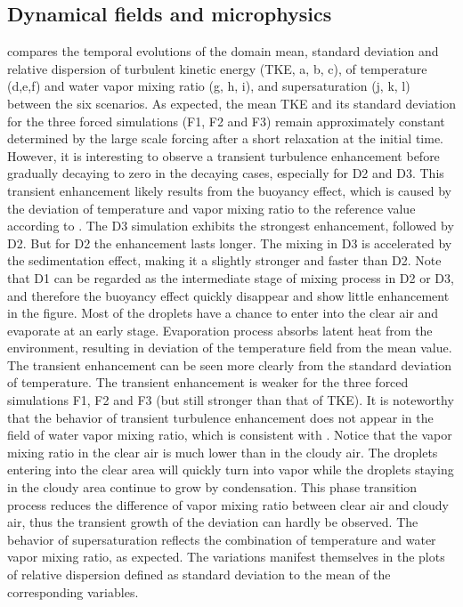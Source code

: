 \subsection{Dynamical fields and microphysics}
 compares the temporal evolutions of the domain mean, standard deviation and relative dispersion of turbulent kinetic energy (TKE, a, b, c), of temperature (d,e,f) and water vapor mixing ratio (g, h, i), and supersaturation (j, k, l) between the six scenarios.  As expected, the mean TKE and its standard deviation for the three forced simulations (F1, F2 and F3) remain approximately constant determined by the large scale forcing after a short relaxation at the initial time. However, it is interesting to observe a transient turbulence enhancement before gradually decaying to zero in the decaying cases, especially for D2 and D3. This transient enhancement likely results from the buoyancy effect, which is caused by the deviation of temperature and vapor mixing ratio to the reference value according to . The D3 simulation exhibits the strongest enhancement, followed by D2. But for D2 the enhancement lasts longer. The mixing in D3 is accelerated by the sedimentation effect, making it a slightly stronger and faster than D2. Note that D1 can be regarded as the intermediate stage of mixing process in D2 or D3, and therefore the buoyancy effect quickly disappear and show little enhancement in the figure.  Most of the droplets have a chance to enter into the clear air and evaporate at an early stage. Evaporation process absorbs latent heat from the environment, resulting in deviation of the temperature field from the mean value. The transient enhancement can be seen more clearly from the standard deviation of temperature. The transient enhancement is weaker for the three forced simulations F1, F2 and F3 (but still stronger than that of TKE).  It is noteworthy that the behavior of transient turbulence enhancement does not appear in the field of water vapor mixing ratio, which is consistent with \cite{Kumar14}. Notice that the vapor mixing ratio in the clear air is much lower than in the cloudy air. The droplets entering into the clear area will quickly turn into vapor while the droplets staying in the cloudy area continue to grow by condensation. This phase transition process reduces the difference of vapor mixing ratio between clear air and cloudy air, thus the transient growth of the deviation can hardly be observed.  The behavior of supersaturation reflects the combination of temperature and water vapor mixing ratio, as expected. The variations manifest themselves in the plots of relative dispersion defined as standard deviation to the mean of the corresponding variables.

